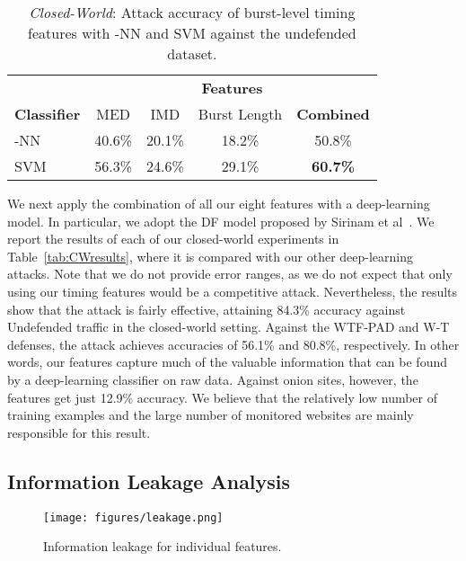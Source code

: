 \documentclass[USenglish,oneside,twocolumn]{article}
\begin{document}
\begin{table}[t]
\renewcommand{\arraystretch}{1.15}
\begin{center}
    \caption{\textit{Closed-World}: Attack accuracy of burst-level timing features with -NN and SVM against the undefended dataset.}\vskip -0.05cm
    \label{tab:undefendedTor}
    \begin{tabular}{l c c c c}
      &  \multicolumn{4}{c}{\textbf{Features}}\\ \cline{2-5}
      \textbf{Classifier} & MED & IMD & Burst Length & \textbf{Combined} \\
        \hline 
      -NN~\cite{wang2014effective} & 40.6\% & 20.1\% & 18.2\% & 50.8\% \\
      SVM~\cite{panchenko2016website} & 56.3\% & 24.6\% & 29.1\% & \textbf{60.7\%} \\
 		\hline
    \end{tabular}\vskip -0.6cm
  \end{center}
\end{table} 
We next apply the combination of all our eight features with a deep-learning model. In particular, we adopt the DF model proposed by Sirinam et al~\cite{Sirinam2018}.
We report the results of each of our closed-world experiments in Table~\ref{tab:CWresults}, where it is compared with our other deep-learning attacks. Note that we do not provide error ranges, as we do not expect that only using our timing features would be a competitive attack.
Nevertheless, the results show that the attack is fairly effective, attaining 84.3\% accuracy against Undefended traffic in the closed-world setting. Against the WTF-PAD and W-T defenses, the attack achieves accuracies of 56.1\% and 80.8\%, respectively. In other words, our features capture much of the valuable information that can be found by a deep-learning classifier on raw data.
Against onion sites, however, the features get just 12.9\% accuracy. We believe that the relatively low number of training examples and the large number of monitored websites are mainly responsible for this result.







\subsection{Information Leakage Analysis}
\label{infor_leakage}

\begin{figure*}[!t]
  \texttt{[image: figures/leakage.png]}
  \caption{Information leakage for individual features.}
  \label{fig:infoleak}
\end{figure*}
\end{document}
